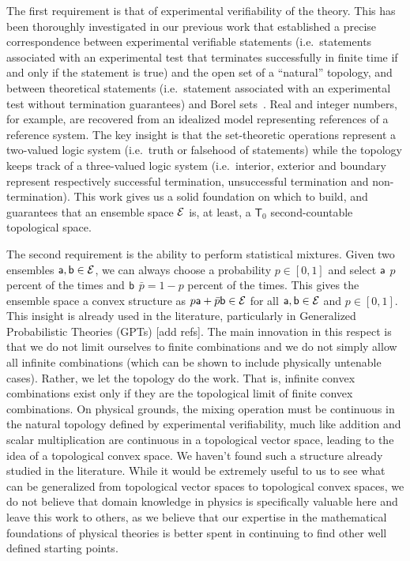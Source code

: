 The first requirement is that of experimental verifiability of the theory. This has been thoroughly investigated in our previous work that established a precise correspondence between experimental verifiable statements (i.e.~statements associated with an experimental test that terminates successfully in finite time if and only if the statement is true) and the open set of a ``natural'' topology, and between theoretical statements (i.e.~statement associated with an experimental test without termination guarantees) and Borel sets~\cite{aop-book,aop-topExpDisting}. Real and integer numbers, for example, are recovered from an idealized model representing references of a reference system. The key insight is that the set-theoretic operations represent a two-valued logic system (i.e.~truth or falsehood of statements) while the topology keeps track of a three-valued logic system (i.e.~interior, exterior and boundary represent respectively successful termination, unsuccessful termination and non-termination). This work gives us a solid foundation on which to build, and guarantees that an ensemble space $\Ens$ is, at least, a $\mathsf{T}_0$ second-countable topological space.

The second requirement is the ability to perform statistical mixtures. Given two ensembles $\ens[a], \ens[b] \in \Ens$, we can always choose a probability $p \in [0,1]$ and select $\ens[a]$ $p$ percent of the times and $\ens[b]$ $\bar{p} = 1-p$ percent of the times. This gives the ensemble space a convex structure as $p \ens[a] + \bar{p} \ens[b] \in \Ens$ for all $\ens[a], \ens[b] \in \Ens$ and $p \in [0,1]$. This insight is already used in the literature, particularly in Generalized Probabilistic Theories (GPTs) [add refs]. The main innovation in this respect is that we do not limit ourselves to finite combinations and we do not simply allow all infinite combinations (which can be shown to include physically untenable cases). Rather, we let the topology do the work. That is, infinite convex combinations exist only if they are the topological limit of finite convex combinations. On physical grounds, the mixing operation must be continuous in the natural topology defined by experimental verifiability, much like addition and scalar multiplication are continuous in a topological vector space, leading to the idea of a topological convex space. We haven't found such a structure already studied in the literature. While it would be extremely useful to us to see what can be generalized from topological vector spaces to topological convex spaces, we do not believe that domain knowledge in physics is specifically valuable here and leave this work to others, as we believe that our expertise in the mathematical foundations of physical theories is better spent in continuing to find other well defined starting points.

